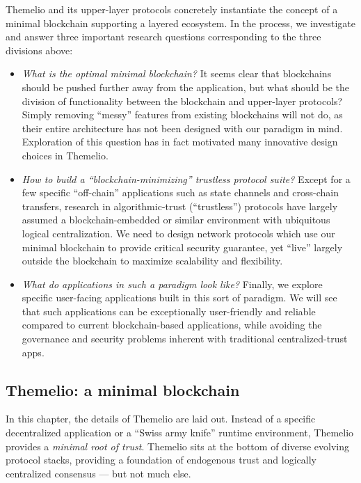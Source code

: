 \documentclass[]{article}
\providecommand{\tightlist}{%
  \setlength{\itemsep}{0pt}\setlength{\parskip}{0pt}}
\begin{document}
Themelio and its upper-layer protocols concretely instantiate the
concept of a minimal blockchain supporting a layered ecosystem. In the
process, we investigate and answer three important research questions
corresponding to the three divisions above:

\begin{itemize}
\tightlist
\item
  \emph{What is the optimal minimal blockchain?} It seems clear that
  blockchains should be pushed further away from the application, but
  what should be the division of functionality between the blockchain
  and upper-layer protocols? Simply removing ``messy'' features from
  existing blockchains will not do, as their entire architecture has not
  been designed with our paradigm in mind. Exploration of this question
  has in fact motivated many innovative design choices in Themelio.
\item
  \emph{How to build a ``blockchain-minimizing'' trustless protocol
  suite?} Except for a few specific ``off-chain'' applications such as
  state channels and cross-chain transfers, research in
  algorithmic-trust (``trustless'') protocols have largely assumed a
  blockchain-embedded or similar environment with ubiquitous logical
  centralization. We need to design network protocols which use our
  minimal blockchain to provide critical security guarantee, yet
  ``live'' largely outside the blockchain to maximize scalability and
  flexibility.
\item
  \emph{What do applications in such a paradigm look like?} Finally, we
  explore specific user-facing applications built in this sort of
  paradigm. We will see that such applications can be exceptionally
  user-friendly and reliable compared to current blockchain-based
  applications, while avoiding the governance and security problems
  inherent with traditional centralized-trust apps.
\end{itemize}

\hypertarget{themelio-a-minimal-blockchain}{%
\subsection{Themelio: a minimal
blockchain}\label{themelio-a-minimal-blockchain}}

In this chapter, the details of Themelio are laid out. Instead of a
specific decentralized application or a ``Swiss army knife'' runtime
environment, Themelio provides a \emph{minimal root of trust}. Themelio
sits at the bottom of diverse evolving protocol stacks, providing a
foundation of endogenous trust and logically centralized consensus ---
but not much else.
\end{document}
